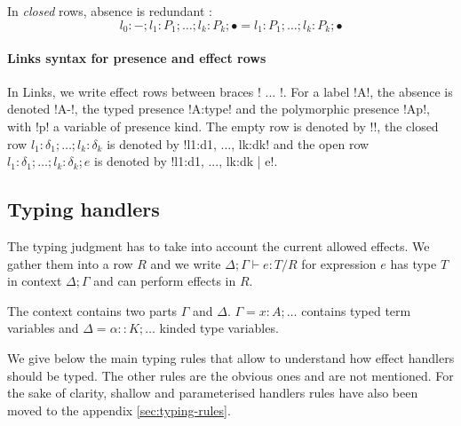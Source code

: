\documentclass[11pt, nonacm=true, language=french, language=english]{acmart}
\begin{document}
\begin{rem}
  In \emph{closed} rows, absence is redundant :
  $$ l_{0}:- ; l_{1}:P_{1} ; \dots ; l_{k}:P_{k} ; \bullet = l_{1}:P_{1} ; \dots ; l_{k} : P_{k} ; \bullet $$
\end{rem}

\paragraph{Links syntax for presence and effect rows}
In Links, we write effect rows between braces !{ ... }!. For a label !A!, the absence is denoted !A-!, the typed presence !A:type! and the polymorphic presence !A{p}!, with !p! a variable of presence kind. The empty row is denoted by !{}!, the closed row $l_{1}:\delta_{1}; \dots; l_{k}:\delta_{k}$ is denoted by !{l1:d1, ..., lk:dk}! and the open row $l_{1}:\delta_{1}; \dots; l_{k}:\delta_{k}; e$ is denoted by !{l1:d1, ..., lk:dk | e}!.

\subsection{Typing handlers}
\label{sec:typing-handlers}

The typing judgment has to take into account the current allowed effects. We gather them into a row $R$ and we write $\Delta;\Gamma \vdash e : T / R$ for expression $e$ has type $T$ in context $\Delta;\Gamma$ and can perform effects in $R$.

\begin{rem}
  The context contains two parts $\Gamma$ and $\Delta$. $\Gamma = x : A ; \dots$ contains typed term variables and $\Delta = \alpha :: K; \dots$ kinded type variables.
\end{rem}

We give below the main typing rules that allow to understand how effect handlers should be typed. The other rules are the obvious ones and are not mentioned. For the sake of clarity, shallow and parameterised handlers rules have also been moved to the appendix \ref{sec:typing-rules}.
\end{document}
